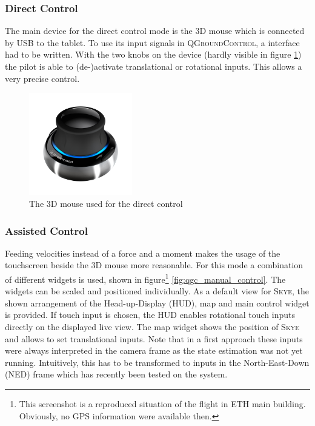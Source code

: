 \subsubsection{Direct Control}
The main device for the direct control mode is the 3D mouse which is connected by USB to the tablet. To use its input signals in  \textsc{QGroundControl}, a interface had to be written. With the two knobs on the device (hardly visible in figure \ref{fig:3D_mouse}) the pilot is able to (de-)activate translational or rotational inputs. This allows a very precise control.

\begin{figure}[H] %
	\begin{center}
		\includegraphics[width=0.4\textwidth]{3dx_productimage}
		\caption{The 3D mouse used for the direct control }  
		\label{fig:3D_mouse}
	\end{center}
\end{figure}

\subsubsection{Assisted Control}
\label{subsub:assistedcontrol}
Feeding velocities instead of a force and a moment makes the usage of the touchscreen beside the 3D mouse more reasonable. For this mode a combination of different widgets is used, shown in figure\footnote{This screenshot is a reproduced situation of the flight in ETH main building. Obviously, no GPS information were available then.} \ref{fig:qgc_manual_control}. The widgets can be scaled and positioned individually. As a default view for \textsc{Skye}, the shown arrangement of the Head-up-Display (HUD), map and main control widget is provided. If touch input is chosen, the HUD enables rotational touch inputs directly on the displayed live view. The map widget shows the position of \textsc{Skye} and allows to set translational inputs. Note that in a first approach these inputs were always interpreted in the camera frame as the state estimation was not yet running. Intuitively, this has to be transformed to inputs in the North-East-Down (NED) frame which has recently been tested on the system.

